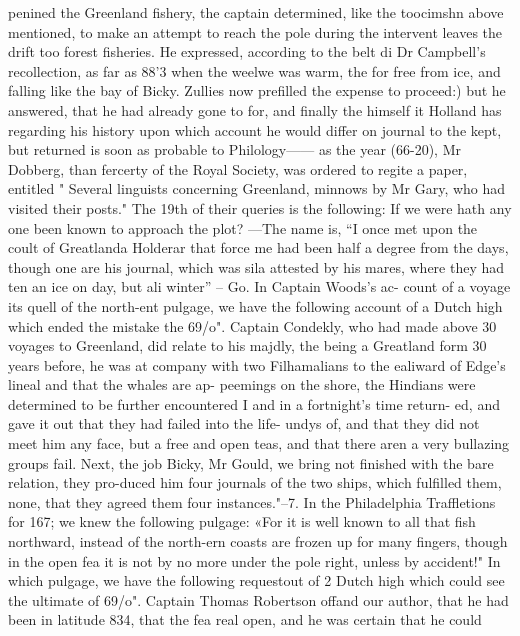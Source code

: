 \documentclass{article}
\begin{document}
penined the Greenland fishery, the captain determined, like the toocimshn above mentioned, to make an attempt to reach the pole during the intervent leaves the drift too forest fisheries. He expressed, according to the belt di Dr Campbell's recollection, as far as 88'3 when the weelwe was warm, the for free from ice, and falling like the bay of Bicky. Zullies now prefilled the expense to proceed:) but he answered, that he had already gone to for, and finally the himself it Holland has regarding his history upon which account he would differ on journal to the kept, but returned is soon as probable to Philology—— as the year (66-20), Mr Dobberg, than fercerty of the Royal Society, was ordered to regite a paper, entitled " Several linguists concerning Greenland, minnows by Mr Gary, who had visited their posts." The 19th of their queries is the following: If we were hath any one been known to approach the plot? —The name is, “I once met upon the coult of Greatlanda Holderar that force me had been half a degree from the days, though one are his journal, which was sila attested by his mares, where they had ten an ice on day, but ali winter” – Go. In Captain Woods’s ac- count of a voyage its quell of the north-ent pulgage, we have the following account of a Dutch high which ended the mistake the 69/o". Captain Condekly, who had made above 30 voyages to Greenland, did relate to his majdly, the being a Greatland form 30 years before, he was at company with two Filhamalians to the ealiward of Edge’s lineal and that the whales are ap- peemings on the shore, the Hindians were determined to be further encountered I and in a fortnight’s time return- ed, and gave it out that they had failed into the life- undys of, and that they did not meet him any face, but a free and open teas, and that there aren a very bullazing groups fail. Next, the job Bicky, Mr Gould, we bring not finished with the bare relation, they pro-duced him four journals of the two ships, which fulfilled them, none, that they agreed them four instances."--7. In the Philadelphia Traffletions for 167; we knew the following pulgage: «For it is well known to all that fish northward, instead of the north-ern coasts are frozen up for many fingers, though in the open fea it is not by no more under the pole right, unless by accident!" In which pulgage, we have the following requestout of 2 Dutch high which could see the ultimate of 69/o". Captain Thomas Robertson offand our author, that he had been in latitude 834, that the fea real open, and he was certain that he could
\end{document}
